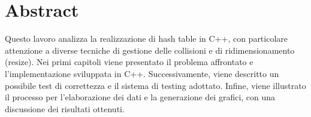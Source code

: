 \chapter*{Abstract}

Questo lavoro analizza la realizzazione di hash table in C++, con particolare attenzione a diverse tecniche di gestione delle collisioni e 
di ridimensionamento (resize).  
Nei primi capitoli viene presentato il problema affrontato e l'implementazione sviluppata in C++.  
Successivamente, viene descritto un possibile test di correttezza e il sistema di testing adottato.  
Infine, viene illustrato il processo per l'elaborazione dei dati e la generazione dei grafici, con una discussione dei risultati ottenuti.

\bigskip